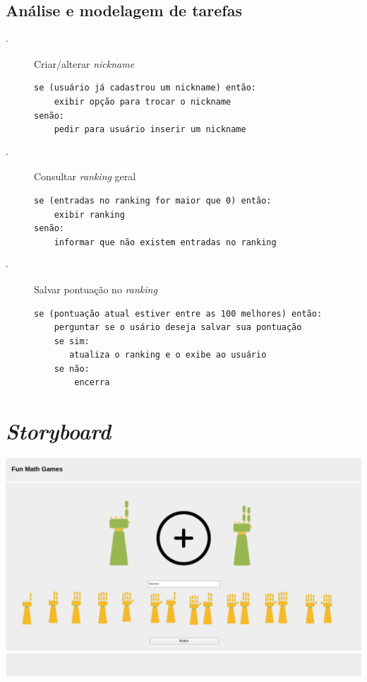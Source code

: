 \documentclass[
    12pt,               %
    openany,          	%
    twoside,            %
    a4paper,            %
    brazil              %
    ]{abntex2}
\begin{document}
\section{Análise e modelagem de tarefas}
\begin{description}
\item[$\cdot$] Criar/alterar \textit{nickname}
\begin{verbatim}
se (usuário já cadastrou um nickname) então:
    exibir opção para trocar o nickname
senão:
    pedir para usuário inserir um nickname
\end{verbatim}

\item[$\cdot$] Consultar \textit{ranking} geral
\begin{verbatim}
se (entradas no ranking for maior que 0) então:
    exibir ranking
senão:
    informar que não existem entradas no ranking
\end{verbatim}

\item[$\cdot$] Salvar pontuação no \textit{ranking}
\begin{verbatim}
se (pontuação atual estiver entre as 100 melhores) então:
    perguntar se o usário deseja salvar sua pontuação
    se sim:
       atualiza o ranking e o exibe ao usuário
    se não:
        encerra
\end{verbatim}

\end{description}

\chapter{\textit{Storyboard}}

\includegraphics[scale=0.3]{storyboard}
\end{document}
